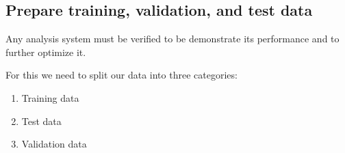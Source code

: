 \documentclass[letterpaper,10pt,english]{sphinxmanual}
\begin{document}
\begin{sphinxVerbatim}[commandchars=\\\{\}]
\PYG{p}{[}\PYG{p}{]} \PYG{p}{[}\PYG{p}{]}
\PYG{p}{[}\PYG{p}{]} \PYG{p}{[}\PYG{p}{]}
\end{sphinxVerbatim}

\noindent{}


\subsection{Prepare training, validation, and test data}
\label{\detokenize{ML4NeutronImageSegmentation:prepare-training-validation-and-test-data}}
Any analysis system must be verified to be demonstrate its performance and to further optimize it.

For this we need to split our data into three categories:
\begin{enumerate}
%
\item {} 
Training data

\item {} 
Test data

\item {} 
Validation data

\end{enumerate}
\end{document}
